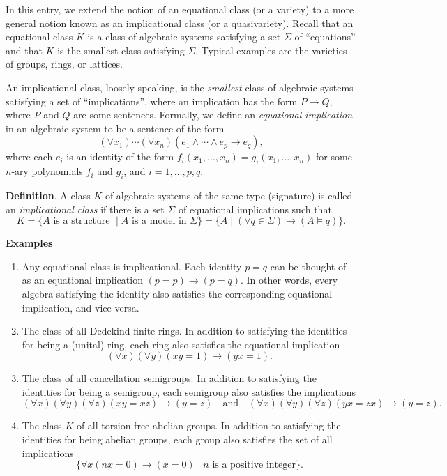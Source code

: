 \documentclass[12pt]{article}
\begin{document}

In this entry, we extend the notion of an equational class (or a variety) to a more general notion known as an implicational class (or a quasivariety).  Recall that an equational class $K$ is a class of algebraic systems satisfying a set $\Sigma$ of ``equations'' and that $K$ is the smallest class satisfying $\Sigma$.  Typical examples are the varieties of groups, rings, or lattices.

An implicational class, loosely speaking, is the \emph{smallest} class of algebraic systems satisfying a set of ``implications'', where an implication has the form $P\to Q$, where $P$ and $Q$ are some sentences.  Formally, we define an \emph{equational implication} in an algebraic system to be a sentence of the form 
$$(\forall x_1)\cdots (\forall x_n)(e_1\wedge \cdots \wedge e_p \to e_q),$$ 
where each $e_i$ is an identity of the form $f_i(x_1,\ldots,x_n)=g_i(x_1,\ldots,x_n)$ for some $n$-ary polynomials $f_i$ and $g_i$, and $i=1,\ldots,p,q$.

\textbf{Definition}.  A class $K$ of algebraic systems of the same type (signature) is called an \emph{implicational class} if there is a set $\Sigma$ of equational implications such that $$K=\lbrace A \mbox{ is a structure }\mid A \mbox{ is a model in } \Sigma\rbrace=\lbrace A\mid (\forall q\in \Sigma)\to (A\models q)\rbrace.$$

\textbf{Examples}
\begin{enumerate}
\item Any equational class is implicational.  Each identity $p=q$ can be thought of as an equational implication $(p=p)\to (p=q)$.  In other words, every algebra satisfying the identity also satisfies the corresponding equational implication, and vice versa.  
\item The class of all Dedekind-finite rings.  In addition to satisfying the identities for being a (unital) ring, each ring also satisfies the equational implication $$(\forall x)(\forall y)(xy=1)\to (yx=1).$$
\item The class of all cancellation semigroups.  In addition to satisfying the identities for being a semigroup, each semigroup also satisfies the implications $$(\forall x)(\forall y)(\forall z)(xy=xz)\to (y=z)\quad \mbox{and} \quad (\forall x)(\forall y)(\forall z)(yx=zx)\to (y=z).$$
\item The class $K$ of all torsion free abelian groups.  In addition to satisfying the identities for being abelian groups, each group also satisfies the set of all implications $$\lbrace \forall x (nx=0)\to (x=0) \mid n \mbox{ is a positive integer}\rbrace.$$
\end{enumerate}
\end{document}
